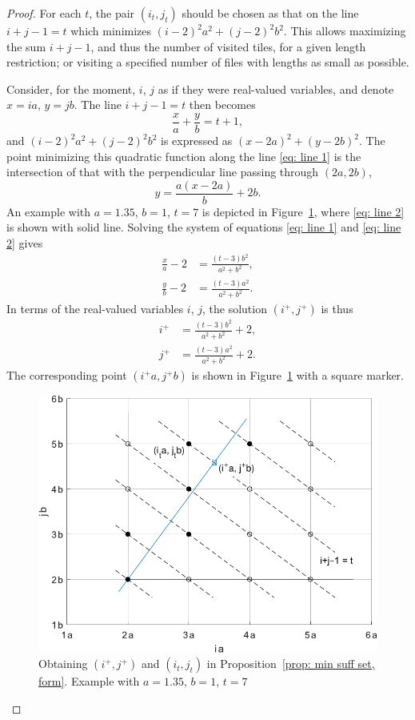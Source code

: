 \documentclass[12pt, a4paper]{article}
\newcommand{\tiles}{t} %
\newcommand{\isolr}{i^+}
\newcommand{\jsolr}{j^+}
\begin{document}
\begin{proof}
For each $\tiles$, the pair $(i_\tiles,j_\tiles)$ should be chosen as that on the line $i+j-1=\tiles$ which minimizes $(i-2)^2 a^2 + (j-2)^2 b^2$. This allows maximizing the sum $i+j-1$, and thus the number of visited tiles, for a given length restriction; or visiting a specified number of files with lengths as small as possible.

Consider, for the moment, $i$, $j$ as if they were real-valued variables, and denote $x=ia$, $y=jb$. The line $i+j-1 = \tiles$ then becomes
\begin{equation}
\label{eq: line 1}
\frac x a + \frac y b = \tiles + 1,
\end{equation}
and $(i-2)^2 a^2 + (j-2)^2 b^2$ is expressed as $(x-2a)^2+(y-2b)^2$. The point minimizing this quadratic function along the line \eqref{eq: line 1} is the intersection of that with the perpendicular line passing through $(2a,2b)$,
\begin{equation}
\label{eq: line 2}
y = \frac {a (x-2a)} b + 2b.
\end{equation}
An example with $a=1.35$, $b=1$, $\tiles=7$ is depicted in Figure~\ref{fig: min suff set, form}, where \eqref{eq: line 2} is shown with solid line. Solving the system of equations \eqref{eq: line 1} and \eqref{eq: line 2} gives 
\begin{align}
\frac x a - 2 &= \frac{(t-3)b^2}{a^2+b^2}, \\
\frac y b - 2 &= \frac{(t-3)a^2}{a^2+b^2}.
\end{align}
In terms of the real-valued variables $i$, $j$, the solution $(\isolr, \jsolr)$ is thus
\begin{align}
\label{eq: prop: min suff set, form: isolr}
\isolr &= \frac{(t-3)b^2}{a^2+b^2} + 2, \\
\label{eq: prop: min suff set, form: jsolr}
\jsolr &= \frac{(t-3)a^2}{a^2+b^2} + 2.
\end{align}
The corresponding point $(\isolr a, \jsolr b)$ is shown in Figure~\ref{fig: min suff set, form} with a square marker.

\begin{figure}%
\centering%
\includegraphics[width=.7\textwidth]{mss}%
\caption{Obtaining $(\isolr, \jsolr)$ and $(i_\tiles, j_\tiles)$ in  Proposition~\ref{prop: min suff set, form}. Example with $a=1.35$, $b=1$, $\tiles=7$%
}%
\label{fig: min suff set, form}%
\end{figure}%


\end{proof}
\end{document}
